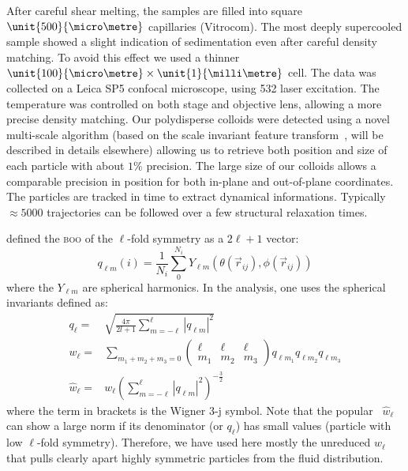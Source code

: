 After careful shear melting, the samples are filled into square $\unit{500}{\micro\metre}$ capillaries (Vitrocom). The most deeply supercooled sample showed a slight indication of sedimentation even after careful density matching. To avoid this effect we used a thinner $\unit{100}{\micro\metre}\times\unit{1}{\milli\metre}$ cell. The data was collected on a Leica SP5 confocal microscope, using \unit{532}{\nano\meter} laser excitation. The temperature was controlled on both stage and objective lens, allowing a more precise density matching. Our polydisperse colloids were detected using a novel multi-scale algorithm (based on the scale invariant feature transform~\cite{Lowe2004}, will be described in details elsewhere) allowing us to retrieve both position and size of each particle with about $1\%$ precision. The large size of our colloids allows a comparable precision in position for both in-plane and out-of-plane coordinates. The particles are tracked in time to extract dynamical informations. Typically $\approx 5000$ trajectories can be followed over a few structural relaxation times.



\citet{steinhardt1983boo} defined the \textsc{boo} of the $\ell$-fold symmetry as a $2\ell+1$ vector:
\begin{equation}
	q_{\ell m}(i) = \frac{1}{N_i}\sum_{0}^{N_i} Y_{\ell m}(\theta(\vec r_{ij}),\phi(\vec r_{ij}))
	\label{eq:qlm}
\end{equation}
where the $Y_{\ell m}$ are spherical harmonics. In the analysis, one uses the spherical invariants defined as:
\begin{align}
	q_\ell =& \sqrt{\frac{4\pi}{2l+1} \sum_{m=-\ell}^{\ell} |q_{\ell m}|^2 }\label{eq:ql}\\
	w_\ell =& \sum_{m_1+m_2+m_3=0} 
			\left( \begin{array}{ccc}
				\ell & \ell & \ell \\
				m_1 & m_2 & m_3 
			\end{array} \right)
			q_{\ell m_1} q_{\ell m_2} q_{\ell m_3} \label{eq:wl}\\
	\hat{w}_\ell =& w_\ell{\left( \sum_{m=-\ell}^{\ell} |q_{\ell m}|^2 \right)}^{-\frac{3}{2}}
\end{align}
where the term in brackets is the Wigner 3-j symbol. Note that the popular~\citep{steinhardt1983boo,Lechner2008} $\hat{w}_\ell$ can show a large norm if its denominator (or $q_\ell$) has small values (particle with low $\ell$-fold symmetry). Therefore, we have used here mostly the unreduced $w_\ell$ that pulls clearly apart highly symmetric particles from the fluid distribution.

